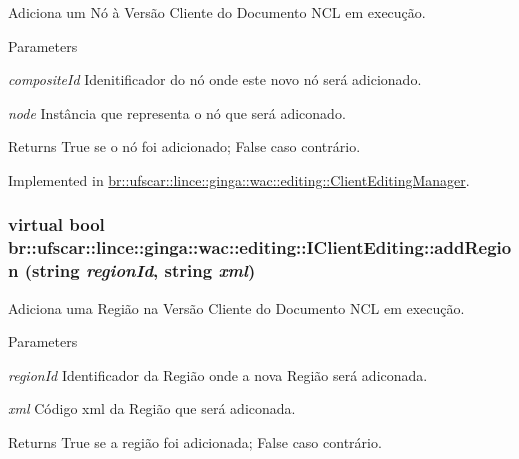 Adiciona um Nó à Versão Cliente do Documento NCL em execução. 


\begin{DoxyParams}{Parameters}
\item[{\em compositeId}]Idenitificador do nó onde este novo nó será adicionado. \item[{\em node}]Instância que representa o nó que será adiconado. \end{DoxyParams}
\begin{DoxyReturn}{Returns}
True se o nó foi adicionado; False caso contrário. 
\end{DoxyReturn}


Implemented in \hyperlink{classbr_1_1ufscar_1_1lince_1_1ginga_1_1wac_1_1editing_1_1ClientEditingManager_a8e27f52402bb58a3e49d63b28652b2b9}{br::ufscar::lince::ginga::wac::editing::ClientEditingManager}.

\hypertarget{classbr_1_1ufscar_1_1lince_1_1ginga_1_1wac_1_1editing_1_1IClientEditing_afaa30256c70e59a36820317d203869fc}{
\subsubsection[{addRegion}]{\setlength{\rightskip}{0pt plus 5cm}virtual bool br::ufscar::lince::ginga::wac::editing::IClientEditing::addRegion (string {\em regionId}, \/  string {\em xml})}}
\label{classbr_1_1ufscar_1_1lince_1_1ginga_1_1wac_1_1editing_1_1IClientEditing_afaa30256c70e59a36820317d203869fc}


Adiciona uma Região na Versão Cliente do Documento NCL em execução. 


\begin{DoxyParams}{Parameters}
\item[{\em regionId}]Identificador da Região onde a nova Região será adiconada. \item[{\em xml}]Código xml da Região que será adiconada. \end{DoxyParams}
\begin{DoxyReturn}{Returns}
True se a região foi adicionada; False caso contrário. 
\end{DoxyReturn}


